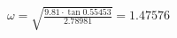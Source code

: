 \documentclass[preview]{standalone}
\begin{document}
\begin{align*}
\omega=\sqrt{\frac{9.81\cdot\tan{0.55453}}{2.78981}}=1.47576
\end{align*}
\end{document}
